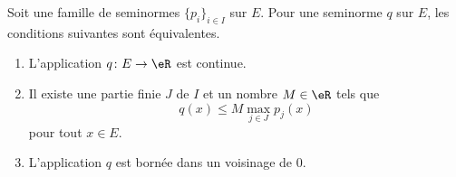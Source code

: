 \begin{theorem}		\label{THOooTKWYooYYiBNa}
	Soit une famille de seminormes \( \{ p_i \}_{i\in I}\) sur \( E\). Pour une seminorme \( q\) sur \( E\), les conditions suivantes sont équivalentes.
	\begin{enumerate}
		\item		\label{ITEMooHKNYooARXiXs}
		      L'application \(q \colon E\to \eR  \) est continue.
		\item		\label{ITEMooBBNCooGwHrUI}
		      Il existe une partie finie \( J\) de \( I\) et un nombre \( M\in \eR\) tels que
		      \begin{equation}
			      q(x)\leq M\max_{j\in J}p_j(x)
		      \end{equation}
		      pour tout \( x\in E\).
		\item		\label{ITEMooWXSWooVfvSUy}
		      L'application \( q\) est bornée dans un voisinage de \( 0\).
	\end{enumerate}
\end{theorem}

